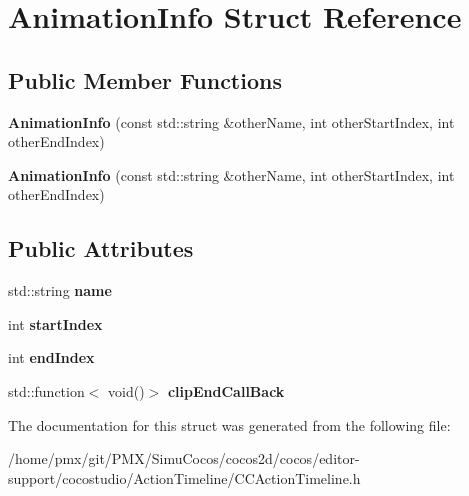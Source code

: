 \hypertarget{structAnimationInfo}{}\section{Animation\+Info Struct Reference}
\label{structAnimationInfo}
\subsection*{Public Member Functions}
\begin{DoxyCompactItemize}
\item 
\mbox{\label{structAnimationInfo_acfac1125cdc57502c933eeec4173b70e}} 
{\bfseries Animation\+Info} (const std\+::string \&other\+Name, int other\+Start\+Index, int other\+End\+Index)
\item 
\mbox{\label{structAnimationInfo_acfac1125cdc57502c933eeec4173b70e}} 
{\bfseries Animation\+Info} (const std\+::string \&other\+Name, int other\+Start\+Index, int other\+End\+Index)
\end{DoxyCompactItemize}
\subsection*{Public Attributes}
\begin{DoxyCompactItemize}
\item 
\mbox{\label{structAnimationInfo_a074f5f5074096be888f5c5fa64fe06be}} 
std\+::string {\bfseries name}
\item 
\mbox{\label{structAnimationInfo_a088a49846559235e72d46c72bd2a7a36}} 
int {\bfseries start\+Index}
\item 
\mbox{\label{structAnimationInfo_a2696448639c06ef73e23a2ae5bdb83bd}} 
int {\bfseries end\+Index}
\item 
\mbox{\label{structAnimationInfo_a25ddf037429775979ad40cca592899dd}} 
std\+::function$<$ void()$>$ {\bfseries clip\+End\+Call\+Back}
\end{DoxyCompactItemize}


The documentation for this struct was generated from the following file\+:\begin{DoxyCompactItemize}
\item 
/home/pmx/git/\+P\+M\+X/\+Simu\+Cocos/cocos2d/cocos/editor-\/support/cocostudio/\+Action\+Timeline/C\+C\+Action\+Timeline.\+h\end{DoxyCompactItemize}
